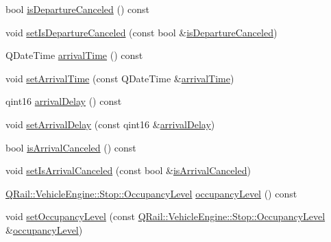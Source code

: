 \begin{DoxyCompactItemize}
\item 
bool \mbox{\hyperlink{classQRail_1_1VehicleEngine_1_1Stop_a887692087d13ec4cd93c60560be9c72a}{is\+Departure\+Canceled}} () const
\item 
void \mbox{\hyperlink{classQRail_1_1VehicleEngine_1_1Stop_aade4a076fb3e828564595d94e0775ce6}{set\+Is\+Departure\+Canceled}} (const bool \&\mbox{\hyperlink{classQRail_1_1VehicleEngine_1_1Stop_a887692087d13ec4cd93c60560be9c72a}{is\+Departure\+Canceled}})
\item 
Q\+Date\+Time \mbox{\hyperlink{classQRail_1_1VehicleEngine_1_1Stop_a09c5419b7717b2849613cb500ce4b029}{arrival\+Time}} () const
\item 
void \mbox{\hyperlink{classQRail_1_1VehicleEngine_1_1Stop_a48d2b47e09125ef86756b065ed6c2b28}{set\+Arrival\+Time}} (const Q\+Date\+Time \&\mbox{\hyperlink{classQRail_1_1VehicleEngine_1_1Stop_a09c5419b7717b2849613cb500ce4b029}{arrival\+Time}})
\item 
qint16 \mbox{\hyperlink{classQRail_1_1VehicleEngine_1_1Stop_a95e36a003e044cf7c454843bb9ea3f2c}{arrival\+Delay}} () const
\item 
void \mbox{\hyperlink{classQRail_1_1VehicleEngine_1_1Stop_a5564ebcc9e704af94b04ef396c58e0e9}{set\+Arrival\+Delay}} (const qint16 \&\mbox{\hyperlink{classQRail_1_1VehicleEngine_1_1Stop_a95e36a003e044cf7c454843bb9ea3f2c}{arrival\+Delay}})
\item 
bool \mbox{\hyperlink{classQRail_1_1VehicleEngine_1_1Stop_a432b40594e1ceb559bb1a5bcc19cbcd3}{is\+Arrival\+Canceled}} () const
\item 
void \mbox{\hyperlink{classQRail_1_1VehicleEngine_1_1Stop_a72a89bf34475e28bb88e312d4b678e9a}{set\+Is\+Arrival\+Canceled}} (const bool \&\mbox{\hyperlink{classQRail_1_1VehicleEngine_1_1Stop_a432b40594e1ceb559bb1a5bcc19cbcd3}{is\+Arrival\+Canceled}})
\item 
\mbox{\hyperlink{classQRail_1_1VehicleEngine_1_1Stop_ad967ed81b19762bd582c1af07354a6d4}{Q\+Rail\+::\+Vehicle\+Engine\+::\+Stop\+::\+Occupancy\+Level}} \mbox{\hyperlink{classQRail_1_1VehicleEngine_1_1Stop_ac43fa877d20d44b9a46ac1e584423f48}{occupancy\+Level}} () const
\item 
void \mbox{\hyperlink{classQRail_1_1VehicleEngine_1_1Stop_aaf19045fbbb3acf711deff03f86d9042}{set\+Occupancy\+Level}} (const \mbox{\hyperlink{classQRail_1_1VehicleEngine_1_1Stop_ad967ed81b19762bd582c1af07354a6d4}{Q\+Rail\+::\+Vehicle\+Engine\+::\+Stop\+::\+Occupancy\+Level}} \&\mbox{\hyperlink{classQRail_1_1VehicleEngine_1_1Stop_ac43fa877d20d44b9a46ac1e584423f48}{occupancy\+Level}})

\end{DoxyCompactItemize}
